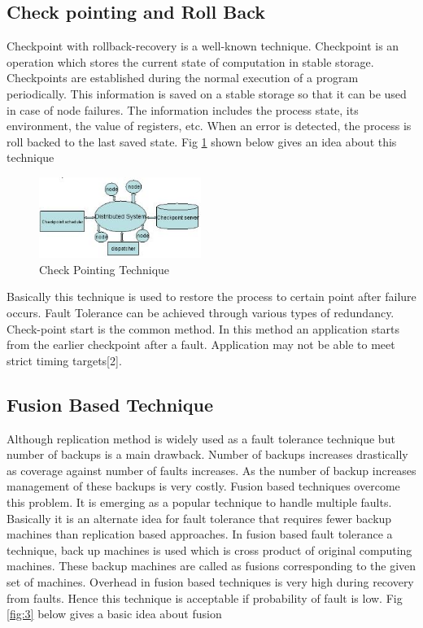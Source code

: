 \documentclass{article}
\begin{document}
\subsection{Check pointing and Roll Back}
Checkpoint with rollback-recovery is a well-known technique. Checkpoint is an operation which stores the current state of computation in stable storage. Checkpoints are established during the normal execution of a program periodically. This information is saved on a stable storage so that it can be used in case of node failures. The information includes the process state, its environment, the value of registers, etc. When an error is detected, the process is roll backed to the last saved state. Fig \ref{fig:2} shown below gives an idea about this technique

\begin{figure}
	\centering
	\includegraphics[width=0.47\textwidth]{../figz/check}
	\caption{Check Pointing Technique}
    \label{fig:2}
\end{figure}

Basically this technique is used to restore the process to certain point after failure occurs. Fault Tolerance can be achieved through various types of redundancy. Check-point start is the common method. In this method an application starts from the earlier checkpoint after a fault. Application may not be able to meet strict timing targets[2].

\subsection{Fusion Based Technique}
Although replication method is widely used as a fault tolerance technique but number of backups is a main drawback. Number of backups increases drastically as coverage against number of faults increases. As the number of backup increases management of these backups is very costly. Fusion based techniques overcome this problem. It is emerging as a popular technique to handle multiple faults. Basically it is an alternate idea for fault tolerance that requires fewer backup machines than replication based approaches. In fusion based fault tolerance a technique, back up machines is used which is cross product of original computing machines. These backup machines are called as fusions corresponding to the given set of machines. Overhead in fusion based techniques is very high during recovery from faults. Hence this technique is acceptable if probability of fault is low.
Fig \ref{fig:3} below gives a basic idea about fusion
\end{document}
